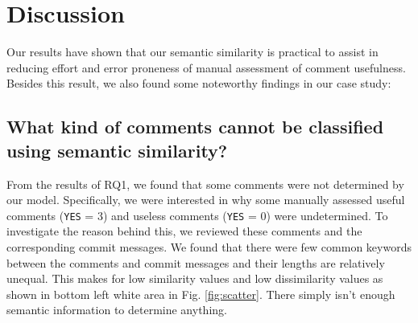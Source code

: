 \section{Discussion}
Our results have shown that our semantic similarity is practical to assist in reducing effort and error proneness of manual assessment of comment usefulness.  
Besides this result, we also found some noteworthy findings in our case study:


\subsection{What kind of comments cannot be classified using semantic similarity?}

From the results of RQ1, we found that some comments were not determined by our model.
Specifically, we were interested in why some manually assessed useful comments (\texttt{YES} = 3) and useless comments (\texttt{YES} = 0) were undetermined.
To investigate the reason behind this, we reviewed these comments and the corresponding commit messages.
We found that there were few common keywords between the comments and commit messages and their lengths are relatively unequal.
This makes for low similarity values and low dissimilarity values as shown in bottom left white area in Fig. \ref{fig:scatter}. There simply isn't enough semantic information to determine anything.




